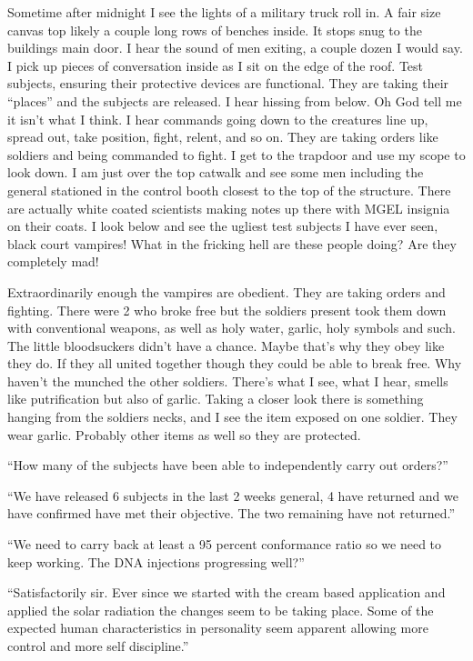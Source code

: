 Sometime after midnight I see the lights of a military truck roll in. A fair size canvas top likely a couple long rows of benches inside. It stops snug to the buildings main door. I hear the sound of men exiting, a couple dozen I would say. I pick up pieces of conversation inside as I sit on the edge of the roof. Test subjects, ensuring their protective devices are functional. They are taking their ``places'' and the subjects are released. I hear hissing from below. Oh God tell me it isn't what I think. I hear commands going down to the creatures line up, spread out, take position, fight, relent, and so on. They are taking orders like soldiers and being commanded to fight. I get to the trapdoor and use my scope to look down. I am just over the top catwalk and see some men including the general stationed in the control booth closest to the top of the structure. There are actually white coated scientists making notes up there with MGEL insignia on their coats. I look below and see the ugliest test subjects I have ever seen, black court vampires! What in the fricking hell are these people doing? Are they completely mad!

Extraordinarily enough the vampires are obedient. They are taking orders and fighting. There were 2 who broke free but the soldiers present took them down with conventional weapons, as well as holy water, garlic, holy symbols and such. The little bloodsuckers didn't have a chance. Maybe that's why they obey like they do. If they all united together though they could be able to break free. Why haven't the munched the other soldiers. There's what I see, what I hear, smells like putrification but also of garlic. Taking a closer look there is something hanging from the soldiers necks, and I see the item exposed on one soldier. They wear garlic. Probably other items as well so they are protected.


``How many of the subjects have been able to independently carry out orders?''

``We have released 6 subjects in the last 2 weeks general, 4 have returned and we have confirmed have met their objective. The two remaining have not returned.''

``We need to carry back at least a 95 percent conformance ratio so we need to keep working. The DNA injections progressing well?''

``Satisfactorily sir. Ever since we started with the cream based application and applied the solar radiation the changes seem to be taking place. Some of the expected human characteristics in personality seem apparent allowing more control and more self discipline.''

